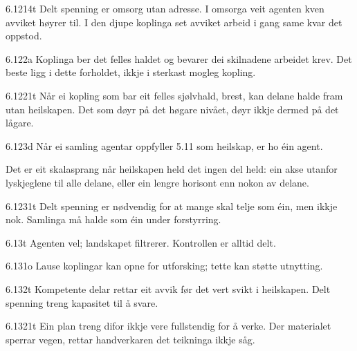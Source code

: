 \begin{formproposition}{6.1214}{t}
Delt spenning er omsorg utan adresse. I omsorga veit agenten kven avviket høyrer til. I den djupe koplinga set avviket arbeid i gang same kvar det oppstod.
\end{formproposition}

\begin{formproposition}{6.122}{a}
Koplinga ber det felles haldet og bevarer dei skilnadene arbeidet krev. Det beste ligg i dette forholdet, ikkje i sterkast mogleg kopling.
\end{formproposition}

\begin{formproposition}{6.1221}{t}
Når ei kopling som bar eit felles sjølvhald, brest, kan delane halde fram utan heilskapen. Det som døyr på det høgare nivået, døyr ikkje dermed på det lågare.
\end{formproposition}

\begin{formproposition}{6.123}{d}
Når ei samling agentar oppfyller 5.11 som heilskap, er ho éin agent.

Det er eit skalasprang når heilskapen held det ingen del held: ein akse utanfor lyskjeglene til alle delane, eller ein lengre horisont enn nokon av delane.
\end{formproposition}

\begin{formproposition}{6.1231}{t}
Delt spenning er nødvendig for at mange skal telje som éin, men ikkje nok. Samlinga må halde som éin under forstyrring.
\end{formproposition}

\begin{formproposition}{6.13}{t}
Agenten vel; landskapet filtrerer. Kontrollen er alltid delt.
\end{formproposition}

\begin{formproposition}{6.131}{o}
Lause koplingar kan opne for utforsking; tette kan støtte utnytting.
\end{formproposition}

\begin{formproposition}{6.132}{t}
Kompetente delar rettar eit avvik før det vert svikt i heilskapen. Delt spenning treng kapasitet til å svare.
\end{formproposition}

\begin{formproposition}{6.1321}{t}
Ein plan treng difor ikkje vere fullstendig for å verke. Der materialet sperrar vegen, rettar handverkaren det teikninga ikkje såg.
\end{formproposition}

